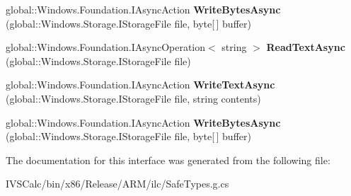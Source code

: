 \begin{DoxyCompactItemize}
\item 
\mbox{\label{interface_windows_1_1_storage_1_1_i_file_i_o_statics_a280b21167530e3370e010a055af41c65}} 
global\+::\+Windows.\+Foundation.\+I\+Async\+Action {\bfseries Write\+Bytes\+Async} (global\+::\+Windows.\+Storage.\+I\+Storage\+File file, byte\mbox{[}$\,$\mbox{]} buffer)
\item 
\mbox{\label{interface_windows_1_1_storage_1_1_i_file_i_o_statics_a8b4c0f9fe8b0238779101b3f516c0f69}} 
global\+::\+Windows.\+Foundation.\+I\+Async\+Operation$<$ string $>$ {\bfseries Read\+Text\+Async} (global\+::\+Windows.\+Storage.\+I\+Storage\+File file)
\item 
\mbox{\label{interface_windows_1_1_storage_1_1_i_file_i_o_statics_ac3b1c12a4964c9e4aac34a8555d76db6}} 
global\+::\+Windows.\+Foundation.\+I\+Async\+Action {\bfseries Write\+Text\+Async} (global\+::\+Windows.\+Storage.\+I\+Storage\+File file, string contents)
\item 
\mbox{\label{interface_windows_1_1_storage_1_1_i_file_i_o_statics_a280b21167530e3370e010a055af41c65}} 
global\+::\+Windows.\+Foundation.\+I\+Async\+Action {\bfseries Write\+Bytes\+Async} (global\+::\+Windows.\+Storage.\+I\+Storage\+File file, byte\mbox{[}$\,$\mbox{]} buffer)
\end{DoxyCompactItemize}


The documentation for this interface was generated from the following file\+:\begin{DoxyCompactItemize}
\item 
I\+V\+S\+Calc/bin/x86/\+Release/\+A\+R\+M/ilc/Safe\+Types.\+g.\+cs\end{DoxyCompactItemize}
